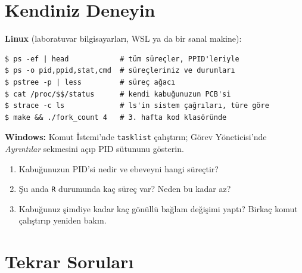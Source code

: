\documentclass[11pt,a4paper]{article}
\newcommand{\cmd}[1]{\texttt{#1}}
\begin{document}
\section{Kendiniz Deneyin}

\begin{tryit}
\textbf{Linux} (laboratuvar bilgisayarları, WSL ya da bir sanal makine):
\begin{lstlisting}[style=term]
$ ps -ef | head            # tüm süreçler, PPID'leriyle
$ ps -o pid,ppid,stat,cmd  # süreçleriniz ve durumları
$ pstree -p | less         # süreç ağacı
$ cat /proc/$$/status      # kendi kabuğunuzun PCB'si
$ strace -c ls             # ls'in sistem çağrıları, türe göre
$ make && ./fork_count 4   # 3. hafta kod klasöründe
\end{lstlisting}
\textbf{Windows:} Komut İstemi'nde \cmd{tasklist} çalıştırın; Görev Yöneticisi'nde \emph{Ayrıntılar} sekmesini açıp PID sütununu gösterin.
\begin{enumerate}[leftmargin=1.4em]
  \item Kabuğunuzun PID'si nedir ve ebeveyni hangi süreçtir?
  \item Şu anda \texttt{R} durumunda kaç süreç var? Neden bu kadar az?
  \item Kabuğunuz şimdiye kadar kaç gönüllü bağlam değişimi yaptı? Birkaç komut çalıştırıp yeniden bakın.
\end{enumerate}
\end{tryit}

\section{Tekrar Soruları}
\end{document}
